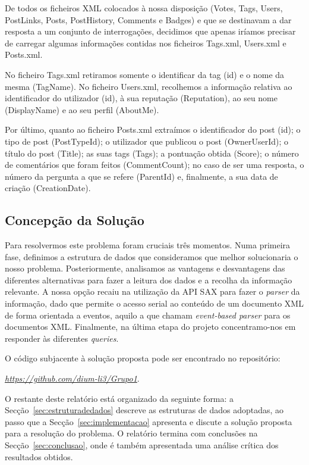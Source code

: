 \documentclass[a4paper]{article}
\begin{document}
De todos os ficheiros XML colocados à nossa disposição (Votes, Tags, Users,
PostLinks, Posts, PostHistory, Comments e Badges) e que se destinavam a dar resposta
a um conjunto de interrogações, decidimos que apenas iríamos precisar de carregar
algumas informações contidas nos ficheiros Tags.xml, Users.xml e Posts.xml. \par
No ficheiro Tags.xml retiramos somente o identificar da tag (id) e o nome da mesma
(TagName). No ficheiro Users.xml, recolhemos a informação relativa ao identificador
do utilizador (id), à sua reputação (Reputation), ao seu nome (DisplayName) e ao seu
perfil (AboutMe). \par
Por último, quanto ao ficheiro Posts.xml extraímos o identificador
do post (id); o tipo de post (PostTypeId); o utilizador que publicou o post
(OwnerUserId); o título do post (Title); as suas tags (Tags); a pontuação obtida
(Score); o número de comentários que foram feitos (CommentCount); no caso de
ser uma resposta, o número da pergunta a que se refere (ParentId) e, finalmente,
a sua data de criação (CreationDate).

\subsection{Concepção da Solução}
\label{sec:solucao}

Para resolvermos este problema foram cruciais três momentos. Numa primeira fase,
definimos a estrutura de dados que consideramos que melhor solucionaria o nosso
problema. Posteriormente, analisamos as vantagens e desvantagens das diferentes
alternativas para fazer a leitura dos dados e a recolha da informação relevante.
A nossa opção recaiu na utilização da API SAX para fazer o \textit{parser} da
informação, dado que permite o acesso serial ao conteúdo de um documento XML de
forma orientada a eventos, aquilo a que chamam \textit{event-based parser} para
os documentos XML.
Finalmente, na última etapa do projeto concentramo-nos em responder
às diferentes \textit{queries}.

O código subjacente à solução proposta pode ser encontrado no repositório:

\begin{center}
\href{https://github.com/dium-li3/Grupo1}{\emph{https://github.com/dium-li3/Grupo1}}.
\end{center}

O restante deste relatório está organizado da seguinte forma: a
Secção~\ref{sec:estruturadedados} descreve as estruturas de dados adoptadas,
ao passo que a Secção~\ref{sec:implementacao}  apresenta e discute a solução
proposta para a resolução do problema. O relatório termina com conclusões na
Secção~\ref{sec:conclusao}, onde é também apresentada uma análise crítica dos
resultados obtidos.
\end{document}
